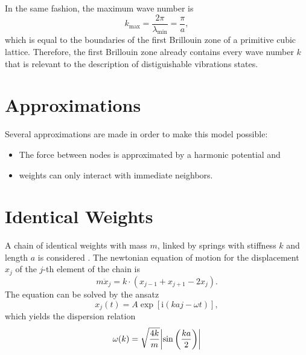 In the same fashion, the maximum wave number is
\begin{equation*}
	k_\text{max}=\frac{2\pi}{\lambda_\text{min}}=\frac{\pi}{a},
\end{equation*}
which is equal to the boundaries of the first Brillouin zone of a primitive cubic lattice.
Therefore, the first Brillouin zone already contains every wave number $k$ that is relevant to the description of distiguishable vibrations states.

\section{Approximations}
Several approximations are made in order to make this model possible:
\begin{itemize}
	\item The force between nodes is approximated by a harmonic potential and
	\item weights can only interact with immediate neighbors.
\end{itemize}

\section{Identical Weights}
A chain of identical weights with mass $m$, linked by springs with stiffness $k$ and length $a$ is considered .
The newtonian equation of motion for the displacement $x_j$ of the $j$-th element of the chain is
\begin{equation*}
	m \ddot x_j = k \cdot \left(x_{j - 1} + x_{j + 1} - 2 x_j \right).
\end{equation*}
The equation can be solved by the ansatz
\begin{equation*}
	x_j(t) = A \exp\left[\text{i} \left(k a j - \omega t\right)\right],
\end{equation*}
which yields the dispersion relation
\begin{equation}
	\omega(k) = \sqrt{\frac{4k}{m}}\abs{\sin\left(\frac{ka}{2}\right)}
\end{equation}

